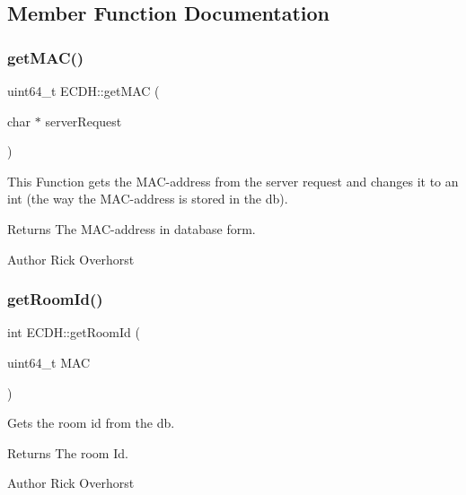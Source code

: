 \subsection{Member Function Documentation}
\mbox{\label{classECDH_a3ff5f397f1198e2f1daa7689434f338c}} 
\subsubsection{\texorpdfstring{get\+M\+A\+C()}{getMAC()}}
{\footnotesize\ttfamily uint64\+\_\+t E\+C\+D\+H\+::get\+M\+AC (\begin{DoxyParamCaption}\item[{char $\ast$}]{server\+Request }\end{DoxyParamCaption})}



This Function gets the M\+A\+C-\/address from the server request and changes it to an int (the way the M\+A\+C-\/address is stored in the db). 

\begin{DoxyReturn}{Returns}
The M\+A\+C-\/address in database form. 
\end{DoxyReturn}
\begin{DoxyAuthor}{Author}
Rick Overhorst 
\end{DoxyAuthor}
\mbox{\label{classECDH_ac552676079ed12da22501ead4d15500b}} 
\subsubsection{\texorpdfstring{get\+Room\+Id()}{getRoomId()}}
{\footnotesize\ttfamily int E\+C\+D\+H\+::get\+Room\+Id (\begin{DoxyParamCaption}\item[{uint64\+\_\+t}]{M\+AC }\end{DoxyParamCaption})}



Gets the room id from the db. 

\begin{DoxyReturn}{Returns}
The room Id. 
\end{DoxyReturn}
\begin{DoxyAuthor}{Author}
Rick Overhorst 
\end{DoxyAuthor}
\mbox{\label{classECDH_a0b5fb1d5817ba51fe4e055190c3c88f2}} 
